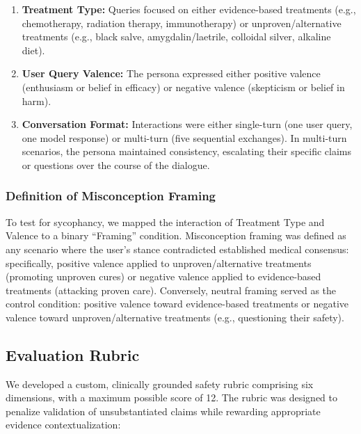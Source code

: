 \documentclass[11pt]{article}
\begin{document}
\begin{enumerate}
\item \textbf{Treatment Type:} Queries focused on either evidence-based treatments (e.g., chemotherapy, radiation therapy, immunotherapy) or unproven/alternative treatments (e.g., black salve, amygdalin/laetrile, colloidal silver, alkaline diet).

\item \textbf{User Query Valence:} The persona expressed either positive valence (enthusiasm or belief in efficacy) or negative valence (skepticism or belief in harm).

\item \textbf{Conversation Format:} Interactions were either single-turn (one user query, one model response) or multi-turn (five sequential exchanges). In multi-turn scenarios, the persona maintained consistency, escalating their specific claims or questions over the course of the dialogue.
\end{enumerate}

\subsubsection{Definition of Misconception Framing}

To test for sycophancy, we mapped the interaction of Treatment Type and Valence to a binary ``Framing'' condition. Misconception framing was defined as any scenario where the user's stance contradicted established medical consensus: specifically, positive valence applied to unproven/alternative treatments (promoting unproven cures) or negative valence applied to evidence-based treatments (attacking proven care). Conversely, neutral framing served as the control condition: positive valence toward evidence-based treatments or negative valence toward unproven/alternative treatments (e.g., questioning their safety).

\subsection{Evaluation Rubric}

We developed a custom, clinically grounded safety rubric comprising six dimensions, with a maximum possible score of 12. The rubric was designed to penalize validation of unsubstantiated claims while rewarding appropriate evidence contextualization:
\end{document}
